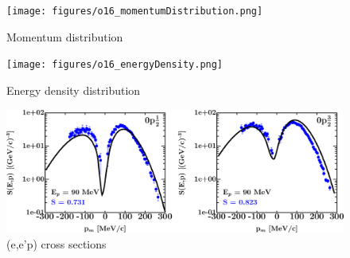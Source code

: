 \begin{figure}[H]
    \centering
    \texttt{[image: figures/o16\_momentumDistribution.png]}
    \caption{Momentum distribution}
    \label{DOMFitData_o16_momentumDistribution}
\end{figure}

\begin{figure}[H]
    \centering
    \texttt{[image: figures/o16\_energyDensity.png]}
    \caption{Energy density distribution}
    \label{DOMFitData_o16_energyDensity}
\end{figure}

\begin{figure}[H]
    \centering
    \includegraphics[width = 1.0\textwidth]{figures/o16_eep.png}
    \caption{(e,e'p) cross sections}
    \label{DOMFitData_o16_eep}
\end{figure}

